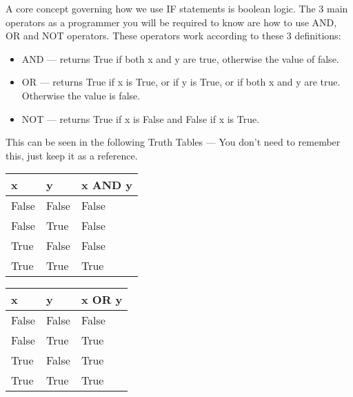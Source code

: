 \documentclass[twocolumn]{article}
\begin{document}
A core concept governing how we use IF statements is boolean logic. The 3 main operators as a programmer you will be required to know are how to use AND, OR and NOT operators. These operators work according to these 3 definitions:
\begin{itemize}
	\item AND --- returns True if both x and y are true, otherwise the value of false. 
	\item OR --- returns True if x is True, or if y is True, or if both x and y are true. Otherwise the value is false.
	\item NOT --- returns True if x is False and False if x is True.
\end{itemize}
This can be seen in the following Truth Tables --- You don't need to remember this, just keep it as a reference.

\begin{center}
	\begin{tabular}{lll} 
		\toprule
		x & y & x AND y \\
		\midrule
		False & False & False \\
		False & True & False \\
		True & False & False \\
		True & True & True \\
		\bottomrule
	\end{tabular}
	\quad
	\begin{tabular}{lll} 
		\toprule
		x & y & x OR y \\
		\midrule
		False & False & False \\
		False & True & True \\
		True & False & True \\
		True & True & True \\
		\bottomrule
	\end{tabular}
\end{center}
\end{document}
